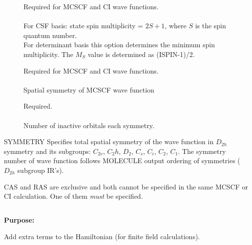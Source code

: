 \begin{description}
\item[]
  Required for MCSCF and CI wave
  functions.\\
  \\
  For CSF basis: state spin multiplicity = $2S + 1$,
  where $S$ is the spin quantum number. \\
  For determinant basis this option determines the minimum spin
  multiplicity.  The $M_S$ value is determined as (ISPIN-1)/2.

\item[]
  Required for MCSCF and CI wave functions.\\
   \\
  Spatial symmetry of MCSCF wave function

\item[]
  Required.\\
   \\
  Number of inactive orbitals each symmetry.

\end{description}


\noindent SYMMETRY   Specifies total spatial symmetry of the wave
function in $D_{2h}$ symmetry and its subgroups: $C_{2v}$, $C_2h$,
$D_2$, $C_s$, $C_i$, $C_2$, $C_1$. The  symmetry number of wave
function follows MOLECULE output ordering of symmetries ($D_{2h}$
subgroup IR's).

\noindent
CAS and RAS are exclusive and
both cannot be specified in the same
MCSCF or CI
calculation. One of them {\em must} be specified.


\pagebreak[3]
\subsection{\label{ref-haminp}}

{\bf Purpose:}

Add extra terms to the Hamiltonian (for finite field calculations).

